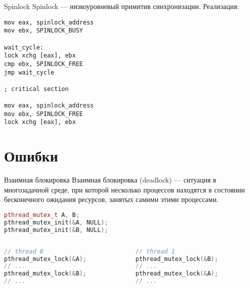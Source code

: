\begin{frame}[fragile]{Spinlock}
Spinlock --- низкоуровневый примитив синхронизации.
\vfill
Реализация:
\begin{lstlisting}[language={[x86masm]Assembler}, basicstyle=\scriptsize]
mov eax, spinlock_address
mov ebx, SPINLOCK_BUSY

wait_cycle:
lock xchg [eax], ebx
cmp ebx, SPINLOCK_FREE
jmp wait_cycle

; critical section

mov eax, spinlock_address
mov ebx, SPINLOCK_FREE
lock xchg [eax], ebx
\end{lstlisting}
\end{frame}

\section{Ошибки}

\begin{frame}[fragile]{Взаимная блокировка}
Взаимная блокировка (\abbr deadlock) --- ситуация в многозадачной среде, при которой несколько процессов находятся в состоянии бесконечного ожидания ресурсов, занятых самими этими процессами.
\vfill
\begin{lstlisting}[language=C++,basicstyle=\ttfamily,keywordstyle=\color{blue},basicstyle=\footnotesize]
pthread_mutex_t A, B;
pthread_mutex_init(&A, NULL);
pthread_mutex_init(&B, NULL);
\end{lstlisting}

\begin{columns}[t]
    \begin{column}[T]{0.45\textwidth}
        \begin{lstlisting}[language=C++,basicstyle=\ttfamily,keywordstyle=\color{blue},basicstyle=\scriptsize]
// thread 0
pthread_mutex_lock(&A);
// ...
pthread_mutex_lock(&B);
// ...
        \end{lstlisting}
    \end{column}
    \begin{column}[T]{0.45\textwidth}
        \begin{lstlisting}[language=C++,basicstyle=\ttfamily,keywordstyle=\color{blue},basicstyle=\scriptsize]
// thread 1
pthread_mutex_lock(&B);
// ...
pthread_mutex_lock(&A);
// ...
        \end{lstlisting}
    \end{column}
\end{columns}
\end{frame}


